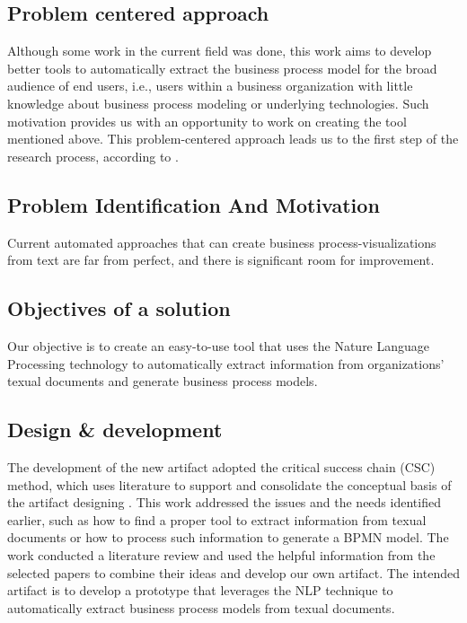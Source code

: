 \subsection{Problem centered approach}
Although some work in the current field was done, this work aims to develop better tools to automatically extract the business process model for the broad audience of end users, i.e., users within a business organization with little knowledge about business process modeling or underlying technologies. Such motivation provides us with an opportunity to work on creating the tool mentioned above. This problem-centered approach leads us to the first step of the research process, according to \cite{DSM_2}.

\subsection{Problem Identification And Motivation}
Current automated approaches that can create business process-visualizations from text are far from perfect, and there is significant room for improvement.



\subsection{Objectives of a solution}
Our objective is to create an easy-to-use tool that uses the Nature Language Processing technology to automatically extract information from organizations' texual documents and generate business process models.

\subsection{Design \& development}
The development of the new artifact adopted the critical success chain (CSC) method, which uses literature to support and consolidate the conceptual basis of the artifact designing \cite{DSM_2}. This work addressed the issues and the needs identified earlier, such as how to find a proper tool to extract information from texual documents or how to process such information to generate a BPMN model. The work conducted a literature review and used the helpful information from the selected papers to combine their ideas and develop our own artifact. The intended artifact is to develop a prototype that leverages the NLP technique to automatically extract business process models from texual documents.

